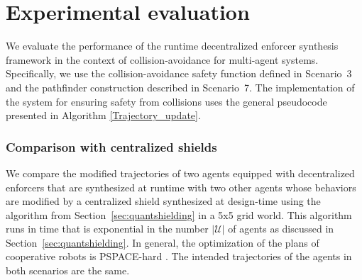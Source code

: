 \section{Experimental evaluation}
We evaluate the performance of the runtime decentralized enforcer synthesis framework in the context of collision-avoidance for multi-agent systems. Specifically, we use the collision-avoidance safety function defined in Scenario~3 and the pathfinder construction described in Scenario~7. 
 The implementation of the system for ensuring safety from collisions uses the general pseudocode presented in Algorithm \ref{Trajectory_update}.
 
 

\subsubsection*{Comparison with centralized shields}

We compare the modified trajectories of two agents equipped with decentralized enforcers that are synthesized at runtime with two other agents whose behaviors are modified by a centralized shield synthesized at design-time using the algorithm from Section~\ref{sec:quantshielding} in a 5x5 grid world. This algorithm runs in time that is exponential in the number  $|\mathcal{U}|$ of agents as discussed in Section~\ref{sec:quantshielding}. In general, the optimization of the plans of cooperative robots is PSPACE-hard \cite{hardness}.
The intended trajectories of the agents in both scenarios are the same. 

